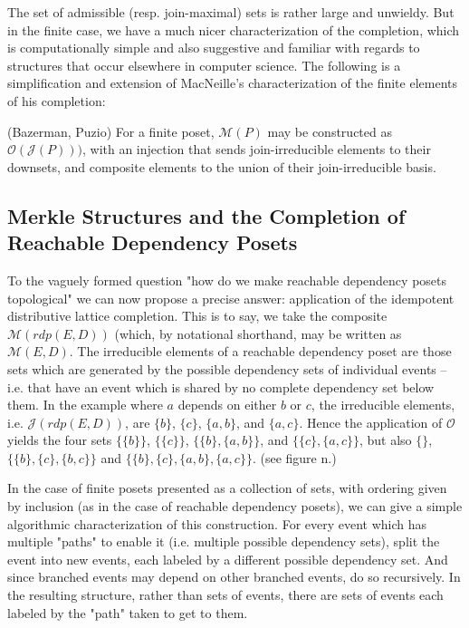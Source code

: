 \documentclass[hoptionsi,review,format=acmsmall]{acmart}
\theoremstyle{definition}
\newcommand{\Mcc}{\mathcal{M}}
\newcommand{\Oc}{\mathcal{O}}
\newcommand{\Jc}{\mathcal{J}}
\begin{document}
The set of admissible (resp. join-maximal) sets is rather large and unwieldy. But in the finite case, we have a much nicer characterization of the completion, which is computationally simple and also suggestive and familiar with regards to structures that occur elsewhere in computer science. The following is a simplification and extension of MacNeille's characterization of the finite elements of his completion:

\begin{theorem}
(Bazerman, Puzio) For a finite poset, \(\Mcc(P)\) may be constructed as \(\Oc(\Jc(P)))\), with an injection that sends join-irreducible elements to their downsets, and composite elements to the union of their join-irreducible basis.
\end{theorem}


\subsection{Merkle Structures and the Completion of Reachable Dependency Posets}

To the vaguely formed question "how do we make reachable dependency posets topological" we can now propose a precise answer: application of the idempotent distributive lattice completion. This is to say, we take the composite \(\Mcc(rdp(E,D))\) (which, by notational shorthand, may be written as \(\Mcc(E,D)\). The irreducible elements of a reachable dependency poset are those sets which are generated by the possible dependency sets of individual events -- i.e. that have an event which is shared by no complete dependency set below them. In the example where \(a\) depends on either \(b\) or \(c\), the irreducible elements, i.e. \(\Jc(rdp(E,D))\), are \(\{b\}\), \(\{c\}\), \(\{a,b\}\), and \(\{a,c\}\). Hence the application of \(\Oc\) yields the four sets \(\{\{b\}\}\), \(\{\{c\}\}\), \(\{\{b\},\{a,b\}\}\), and \(\{\{c\},\{a,c\}\}\), but also \(\{\}\), \(\{\{b\},\{c\},\{b,c\}\}\) and \(\{\{b\},\{c\},\{a,b\},\{a,c\}\}\). (see figure n.)


In the case of finite posets presented as a collection of sets, with ordering given by inclusion (as in the case of reachable dependency posets), we can give a simple algorithmic characterization of this construction. For every event which has multiple "paths" to enable it (i.e. multiple possible dependency sets), split the event into new events, each labeled by a different possible dependency set. And since branched events may depend on other branched events, do so recursively. In the resulting structure, rather than sets of events, there are sets of events each labeled by the "path" taken to get to them. 
\end{document}

